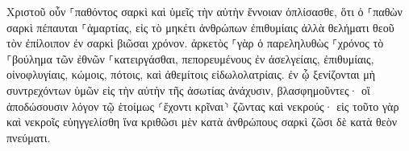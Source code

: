 \documentclass{openreader}
\begin{document}
Χριστοῦ οὖν ⸀παθόντος σαρκὶ καὶ ὑμεῖς τὴν αὐτὴν ἔννοιαν ὁπλίσασθε, ὅτι ὁ ⸀παθὼν σαρκὶ πέπαυται ⸀ἁμαρτίας, 
εἰς τὸ μηκέτι ἀνθρώπων ἐπιθυμίαις ἀλλὰ θελήματι θεοῦ τὸν ἐπίλοιπον ἐν σαρκὶ βιῶσαι χρόνον. 
ἀρκετὸς ⸀γὰρ ὁ παρεληλυθὼς ⸀χρόνος τὸ ⸀βούλημα τῶν ἐθνῶν ⸀κατειργάσθαι, πεπορευμένους ἐν ἀσελγείαις, ἐπιθυμίαις, οἰνοφλυγίαις, κώμοις, πότοις, καὶ ἀθεμίτοις εἰδωλολατρίαις. 
ἐν ᾧ ξενίζονται μὴ συντρεχόντων ὑμῶν εἰς τὴν αὐτὴν τῆς ἀσωτίας ἀνάχυσιν, βλασφημοῦντες· 
οἳ ἀποδώσουσιν λόγον τῷ ἑτοίμως ⸂ἔχοντι κρῖναι⸃ ζῶντας καὶ νεκρούς· 
εἰς τοῦτο γὰρ καὶ νεκροῖς εὐηγγελίσθη ἵνα κριθῶσι μὲν κατὰ ἀνθρώπους σαρκὶ ζῶσι δὲ κατὰ θεὸν πνεύματι. 
\end{document}
